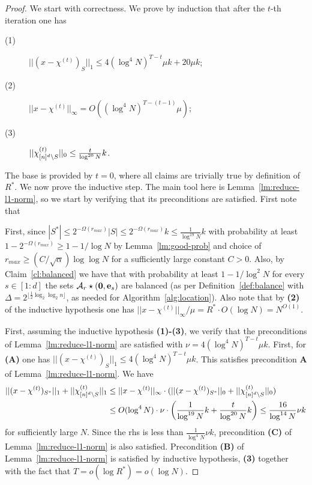 \begin{proof}
We start with correctness. We prove by induction that after the $t$-th iteration one has 
\begin{description}
\item[(1)] $||(x-\chi^{(t)})_S||_1\leq 4(\log^4 N)^{T-t} \mu k+20\mu k$;
\item[(2)] $||x-\chi^{(t)}||_\infty=O((\log^4 N)^{T-(t-1)} \mu)$;
\item[(3)] $||\chi^{(t)}_{{[n]^d}\setminus S}||_0\leq \frac{t}{\log^{20} N} k$.
\end{description}
The base is provided by $t=0$, where all claims are trivially true by definition of $R^*$.
We now prove the inductive step. The main tool here is Lemma~\ref{lm:reduce-l1-norm}, so we start by verifying that its preconditions are satisfied. First note that 

First, since $|S^*|\leq 2^{-\Omega(r_{max})}|S|\leq 2^{-\Omega(r_{max})}k\leq \frac1{\log^{19} N}k$ with probability at least $1-2^{-\Omega(r_{max})}\geq 1-1/\log N$ by Lemma~\ref{lm:good-prob} and choice of $r_{max}\geq (C/\sqrt{\alpha})\log\log N$ for a sufficiently large constant $C>0$. Also, by Claim~\ref{cl:balanced} we have that  with probability at least $1-1/\log^{2} N$ for every $s\in [1:d]$ the sets ${\mathcal{A}}_r\star (\mathbf{0}, \mathbf{e}_s)$ are balanced (as per Definition~\ref{def:balance} with $\Delta=2^{\lfloor \frac1{2}\log_2 \log_2 n\rfloor}$, as needed for Algorithm~\ref{alg:location}). Also note that by {\bf (2)} of the inductive hypothesis one has $||x-\chi^{(t)}||_\infty/\mu=R^* \cdot O(\log N)=N^{O(1)}$.

First, assuming the inductive hypothesis {\bf (1)-(3)}, we verify that the preconditions of Lemma~\ref{lm:reduce-l1-norm} are satisfied with $\nu=4(\log^4 N)^{T-t} \mu k$.  First, for {\bf (A)} one has  $||(x-\chi^{(t)})_S||_1\leq 4(\log^4 N)^{T-t} \mu k$. This satisfies precondition {\bf A} of Lemma~\ref{lm:reduce-l1-norm}.  We have
\begin{equation}\label{eq:123rergregregvvv}
\begin{split}
||(x-\chi^{(t)})_{S^*}||_1+||\chi^{(t)}_{{[n]^d}\setminus S}||_1&\leq ||x-\chi^{(t)}||_\infty\cdot (||(x-\chi^{(t)})_{S^*}||_0+||\chi^{(t)}_{{[n]^d}\setminus S}||_0)\\
&\leq O(\log^4 N)\cdot \nu \cdot \left(\frac1{\log^{19} N}k+\frac{t}{\log^{20} N}k \right)\leq \frac{16}{\log^{14} N}\nu k
\end{split}
\end{equation}
for sufficiently large $N$. Since the rhs is less than $\frac1{\log^4 N}\nu k$, precondition {\bf (C)} of Lemma~\ref{lm:reduce-l1-norm} is also satisfied. Precondition {\bf (B)} of Lemma~\ref{lm:reduce-l1-norm} is satisfied by inductive hypothesis, {\bf (3)} together with the fact that $T=o(\log R^*)=o(\log N)$. 



\end{proof}
